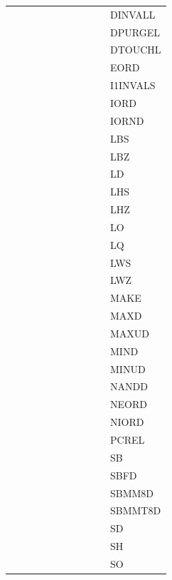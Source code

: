 {\begin{tabular}{|l|l|l|l|l|l|l|l|l|l|l|}
 & & & & & & & & & & \textsf{DINVALL} \\
 & & & & & & & & & & \textsf{DPURGEL} \\
 & & & & & & & & & & \textsf{DTOUCHL} \\
 & & & & & & & & & & \textsf{EORD} \\
 & & & & & & & & & & \textsf{I1INVALS} \\
 & & & & & & & & & & \textsf{IORD} \\
 & & & & & & & & & & \textsf{IORND} \\
 & & & & & & & & & & \textsf{LBS} \\
 & & & & & & & & & & \textsf{LBZ} \\
 & & & & & & & & & & \textsf{LD} \\
 & & & & & & & & & & \textsf{LHS} \\
 & & & & & & & & & & \textsf{LHZ} \\
 & & & & & & & & & & \textsf{LO} \\
 & & & & & & & & & & \textsf{LQ} \\
 & & & & & & & & & & \textsf{LWS} \\
 & & & & & & & & & & \textsf{LWZ} \\
 & & & & & & & & & & \textsf{MAKE} \\
 & & & & & & & & & & \textsf{MAXD} \\
 & & & & & & & & & & \textsf{MAXUD} \\
 & & & & & & & & & & \textsf{MIND} \\
 & & & & & & & & & & \textsf{MINUD} \\
 & & & & & & & & & & \textsf{NANDD} \\
 & & & & & & & & & & \textsf{NEORD} \\
 & & & & & & & & & & \textsf{NIORD} \\
 & & & & & & & & & & \textsf{PCREL} \\
 & & & & & & & & & & \textsf{SB} \\
 & & & & & & & & & & \textsf{SBFD} \\
 & & & & & & & & & & \textsf{SBMM8D} \\
 & & & & & & & & & & \textsf{SBMMT8D} \\
 & & & & & & & & & & \textsf{SD} \\
 & & & & & & & & & & \textsf{SH} \\
 & & & & & & & & & & \textsf{SO} \\
\hline\end{tabular}
}
\smallskip

